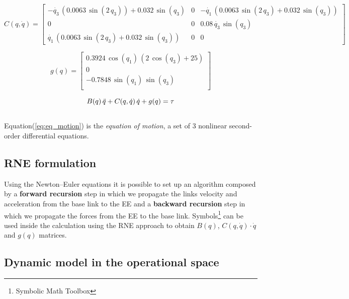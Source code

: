 \documentclass{article}
\begin{document}
\begin{equation}
    C(q, \dot{q}) = \begin{bmatrix}
        -\dot{q_3}\,(0.0063\,\sin(2\,q_3)) + 0.032\,\sin(q_3) & 0 & -\dot{q_1}\,(0.0063\,\sin(2\,q_3) + 0.032\,\sin(q_3)) \\
        0                                                     & 0 & 0.08\,\dot{q_3}\,\sin(q_3)                            \\
        \dot{q_1}\,(0.0063\,\sin(2\,q_3) + 0.032\,\sin(q_3))  & 0 & 0
    \end{bmatrix}
    \label{eq:dynamics_C}
\end{equation}


\begin{equation}
    g(q) = \begin{bmatrix}
        0.3924\,\cos(q_1)\,(2\,\cos(q_3) + 25) \\
        0                                      \\
        -0.7848\,\sin(q_1)\,\sin(q_3)          \\
    \end{bmatrix}
    \label{eq:dynamics_G}
\end{equation}

\begin{equation}
    B(q)\,\ddot{q} + C(q, \dot{q})\,\dot{q} + g(q) = \tau \\
    \label{eq:eq_motion}
\end{equation}
\\
Equation(\ref{eq:eq_motion}) is the \textit{equation of motion}, a set of 3 nonlinear second-order differential equations.


\subsection{RNE formulation}
Using the Newton–Euler equations it is possible to set up an algorithm composed by a \textbf{forward recursion} step in which we propagate the links velocity and acceleration from the base link to the EE and a \textbf{backward recursion} step in which we propagate the forces from the EE to the base link.
Symbols\footnote{Symbolic Math Toolbox} can be used inside the calculation using the RNE approach to obtain $B(q)$, $C(q, \dot{q})\cdot\dot{q}$ and $g(q)$ matrices.

\subsection{Dynamic model in the operational space}
\end{document}
